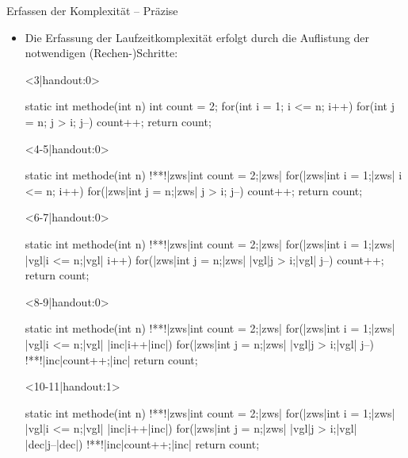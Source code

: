 \begin{frame}[fragile]{Erfassen der Komplexität -- Präzise}
    \begin{itemize}[<+(1)->]
        \widei
        \item Die Erfassung der Laufzeitkomplexität erfolgt durch die Auflistung der notwendigen (Rechen-)Schritte:
\begin{onlyenv}<3|handout:0>
\begin{plainjava}[language=xJava]
static int methode(int n) {
    int count = 2;
    for(int i = 1; i <= n; i++) {
        for(int j = n; j > i; j--)
            count++;
    }
    return count;
}
\end{plainjava}
\end{onlyenv}\begin{onlyenv}<4-5|handout:0>
\begin{plainjava}[language=xJava]
static int methode(int n) {
    !**!|zws|int count = 2;|zws|
    for(|zws|int i = 1;|zws| i <= n; i++) {
        for(|zws|int j = n;|zws| j > i; j--)
            count++;
    }
    return count;
}
\end{plainjava}
\end{onlyenv}\begin{onlyenv}<6-7|handout:0>
\begin{plainjava}[language=xJava]
static int methode(int n) {
    !**!|zws|int count = 2;|zws|
    for(|zws|int i = 1;|zws| |vgl|i <= n;|vgl| i++) {
        for(|zws|int j = n;|zws| |vgl|j > i;|vgl| j--)
            count++;
    }
    return count;
}
\end{plainjava}
\end{onlyenv}\begin{onlyenv}<8-9|handout:0>
\begin{plainjava}[language=xJava]
static int methode(int n) {
    !**!|zws|int count = 2;|zws|
    for(|zws|int i = 1;|zws| |vgl|i <= n;|vgl| |inc|i++|inc|) {
        for(|zws|int j = n;|zws| |vgl|j > i;|vgl| j--)
            !**!|inc|count++;|inc|
    }
    return count;
}
\end{plainjava}
\end{onlyenv}\begin{onlyenv}<10-11|handout:1>
\begin{plainjava}[language=xJava]
static int methode(int n) {
    !**!|zws|int count = 2;|zws|
    for(|zws|int i = 1;|zws| |vgl|i <= n;|vgl| |inc|i++|inc|) {
        for(|zws|int j = n;|zws| |vgl|j > i;|vgl| |dec|j--|dec|)
            !**!|inc|count++;|inc|
    }
    return count;
}
\end{plainjava}

\end{onlyenv}
\end{itemize}
\end{frame}

